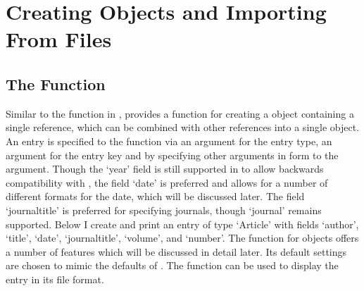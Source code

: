\documentclass[article]{jss}\usepackage[]{graphicx}\usepackage[]{color}
\newcommand{\ourpkg}{\pkg{RefManageR}}
\begin{document}
\section[Creating BibEntry Objects and Importing From Files]{Creating  Objects and Importing From Files}\label{sec_create}


\subsection[The BibEntry Function]{The  Function}
Similar to the  function in , \ourpkg{} provides a function  for creating a  object containing a single reference, which can be combined with other references into a single  object.  An entry is specified to the  function via an argument  for the entry type, an argument  for the entry key and by specifying other arguments
in  form to the  argument.  Though the `year' field is still supported in \Biblatex{} to allow backwards compatibility with \Bibtex{}, the field `date' is preferred and allows for a number of different formats for the date, which will be discussed later.  The field `journaltitle' is preferred for specifying journals, though `journal' remains supported.  Below I create and print an entry of type `Article' with fields `author', `title', `date', `journaltitle', `volume', and `number'.  The  function for  objects offers a number of features which will be discussed in detail later.  Its default settings are chosen to mimic the defaults of \Biblatex{}.  The  function can be used to display the entry in its  file format.
\end{document}
